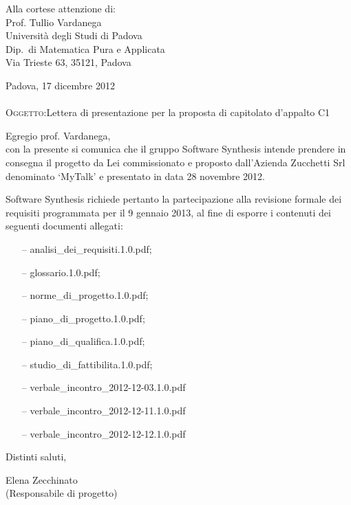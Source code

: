 \documentclass[a4paper,10pt]{letter}
\begin{document}
\begin{flushright}
\begin{minipage}[t]{.5\textwidth}
Alla cortese attenzione di:\\
Prof. Tullio Vardanega\\
Università degli Studi di Padova\\
Dip.~di Matematica Pura e Applicata\\
Via Trieste 63, 35121, Padova\\
\end{minipage}
\end{flushright}

\bigskip
Padova, 17 dicembre 2012\\\\
\bigskip
\textsc{Oggetto:}Lettera di presentazione per la proposta di capitolato d’appalto C1
\bigskip

\noindent{}Egregio prof. Vardanega,\\
\hspace*{11em} con la presente si comunica che il gruppo Software Synthesis intende prendere in consegna il progetto da Lei commissionato e proposto dall'Azienda Zucchetti Srl denominato `MyTalk' e presentato in data 28 novembre 2012.

Software Synthesis richiede pertanto la partecipazione alla revisione formale dei requisiti programmata per il 9 gennaio 2013, al fine di esporre i contenuti dei seguenti documenti allegati:

\begin{itemize}
\item[--] analisi\_dei\_requisiti.1.0.pdf;
\item[--] glossario.1.0.pdf;
\item[--] norme\_di\_progetto.1.0.pdf;
\item[--] piano\_di\_progetto.1.0.pdf;
\item[--] piano\_di\_qualifica.1.0.pdf;
\item[--] studio\_di\_fattibilita.1.0.pdf;
\item[--] verbale\_incontro\_2012-12-03.1.0.pdf
\item[--] verbale\_incontro\_2012-12-11.1.0.pdf
\item[--] verbale\_incontro\_2012-12-12.1.0.pdf
\end{itemize}

\bigskip

Distinti saluti,

\bigskip
\bigskip
\bigskip

\begin{flushright}
\begin{minipage}[t]{.35\textwidth}
Elena Zecchinato\\
(Responsabile di progetto)
\end{minipage}
\end{flushright}
\end{document}
